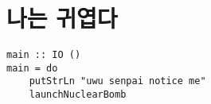 \documentclass{xnuk}
\begin{document}

\section{나는 귀엽다}

\begin{verbatim}
main :: IO ()
main = do
	putStrLn "uwu senpai notice me"
	launchNuclearBomb
\end{verbatim}
\end{document}
